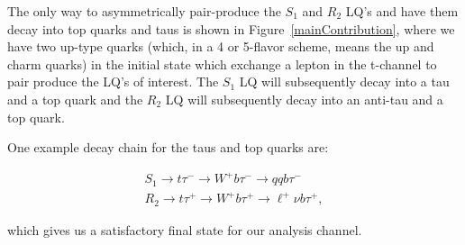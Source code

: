             The only way to asymmetrically pair-produce the $S_1$ and $R_2$ LQ's and have them decay into top quarks and taus is shown in Figure~\ref{mainContribution}, where we have two up-type quarks (which, in a 4 or 5-flavor scheme, means the up and charm quarks) in the initial state which exchange a lepton in the t-channel to pair produce the LQ's of interest. The $S_1$ LQ will subsequently decay into a tau and a top quark and the $R_2$ LQ will subsequently decay into an anti-tau and a top quark.

            One example decay chain for the taus and top quarks are:

            \begin{gather}
                S_1 \rightarrow t\tau^- \rightarrow W^+ b \tau^- \rightarrow qqb\tau^- \\
                R_2 \rightarrow t\tau^+ \rightarrow W^+ b \tau^+ \rightarrow \ell^+ \nu b \tau^+,
            \end{gather}

            which gives us a satisfactory final state for our analysis channel.